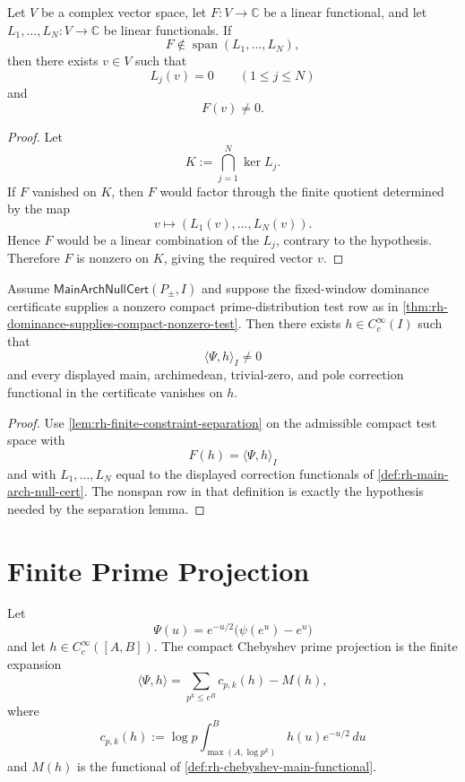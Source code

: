 \begin{lemma}
\label{lem:rh-finite-constraint-separation}
Let $V$ be a complex vector space, let $F:V\to\mathbb C$ be a linear
functional, and let $L_1,\ldots,L_N:V\to\mathbb C$ be linear
functionals.  If
$$
F\notin\operatorname{span}(L_1,\ldots,L_N),
$$
then there exists $v\in V$ such that
$$
L_j(v)=0
\qquad
(1\le j\le N)
$$
and
$$
F(v)\ne0.
$$
\end{lemma}

\begin{proof}
Let
$$
K:=\bigcap_{j=1}^{N}\ker L_j.
$$
If $F$ vanished on $K$, then $F$ would factor through the finite
quotient determined by the map
$$
v\longmapsto (L_1(v),\ldots,L_N(v)).
$$
Hence $F$ would be a linear combination of the $L_j$, contrary to the
hypothesis.  Therefore $F$ is nonzero on $K$, giving the required
vector $v$.
\end{proof}

\begin{theorem}
\label{thm:rh-main-arch-null-cert-gives-nonzero-test}
Assume $\mathsf{MainArchNullCert}(P_\pm,I)$ and suppose the
fixed-window dominance certificate supplies a nonzero compact
prime-distribution test row as in
\autoref{thm:rh-dominance-supplies-compact-nonzero-test}.  Then there
exists $h\in C_c^\infty(I)$ such that
$$
\langle\Psi,h\rangle_I\ne0
$$
and every displayed main, archimedean, trivial-zero, and pole
correction functional in the certificate vanishes on $h$.
\end{theorem}

\begin{proof}
Use \autoref{lem:rh-finite-constraint-separation} on the admissible
compact test space with
$$
F(h)=\langle\Psi,h\rangle_I
$$
and with $L_1,\ldots,L_N$ equal to the displayed correction
functionals of \autoref{def:rh-main-arch-null-cert}.  The nonspan row in
that definition is exactly the hypothesis needed by the separation
lemma.
\end{proof}

\section{Finite Prime Projection}
\label{sec:rh-prime-projection-finite-prime-projection}

\begin{definition}
\label{def:rh-compact-chebyshev-prime-projection}
Let
$$
\Psi(u)=e^{-u/2}\bigl(\psi(e^u)-e^u\bigr)
$$
and let $h\in C_c^\infty([A,B])$.  The compact Chebyshev prime
projection is the finite expansion
$$
\langle\Psi,h\rangle
=
\sum_{p^k\le e^B}c_{p,k}(h)-M(h),
$$
where
$$
c_{p,k}(h)
:=
\log p
\int_{\max(A,\log p^k)}^{B}h(u)e^{-u/2}\,du
$$
and $M(h)$ is the functional of
\autoref{def:rh-chebyshev-main-functional}.
\end{definition}


